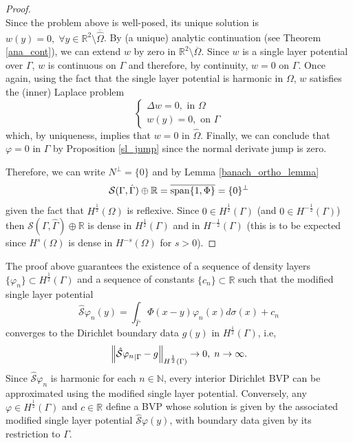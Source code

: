 \begin{proof}
\[    \]
    Since the problem above is well-posed, its unique solution is \(w(y) = 0, \; \forall y \in \mathbb{R}^2\setminus\overline{\hat{\Omega}}\). By (a unique) analytic continuation (see Theorem \eqref{ana_cont}), we can extend \(w\) by zero in \(\mathbb{R}^2\setminus\overline{\Omega}\). Since \(w\) is a single layer potential over \(\Gamma\), \(w\) is continuous on \(\Gamma\) and therefore, by continuity, \(w = 0\) on \(\Gamma\). Once again, using the fact that the single layer potential is harmonic in \(\Omega\), \(w\) satisfies the (inner) Laplace problem
    \[
        \begin{cases}
            \Delta w = 0, \text{ in } \Omega\\
            w(y) = 0, \text{ on } \Gamma
        \end{cases}
    \]
    which, by uniqueness, implies that \(w = 0\) in \(\hat{\Omega}\). Finally, we can conclude that \(\varphi = 0\) in \(\Gamma\) by Proposition \eqref{sl_jump} since the normal derivate jump is zero.

    Therefore, we can write \(N^\perp = \{0\}\) and by Lemma \eqref{banach_ortho_lemma}
    \[
        \mathcal{S}(\Gamma, \hat{\Gamma}) \oplus \mathbb{R} = \overline{\operatorname{span}\{1, \Phi\}} = \{0\}^\perp
    \]
    given the fact that \(H^\frac{1}{2}(\Omega)\) is reflexive. Since \(0 \in H^\frac{1}{2}(\Gamma)\) (and \(0 \in H^{-\frac{1}{2}}(\Gamma)\)) then \(\mathcal{S}(\Gamma, \hat{\Gamma}) \oplus \mathbb{R}\) is dense in \(H^\frac{1}{2}(\Gamma)\) and in \(H^{-\frac{1}{2}}(\Gamma)\) (this is to be expected since \(H^{s}(\Omega)\) is dense in \(H^{-s}(\Omega)\) for \(s > 0\)).
\end{proof}
\begin{remark}
    The proof above guarantees the existence of a sequence of density layers \(\{\varphi_n\} \subset H^{\frac{1}{2}}(\Gamma)\) and a sequence of constants \(\{c_n\} \subset \mathbb{R}\) such that the modified single layer potential
    \[
        \hat{\mathcal{S}}\varphi_n(y) = \int_{\hat{\Gamma}} \Phi(x-y)\varphi_n(x) d\sigma(x) + c_n
    \]
    converges to the Dirichlet boundary data \(g(y)\) in \(H^\frac{1}{2}(\Gamma)\), i.e,
    \[
        \norm{{\hat{\mathcal{S}}\varphi_n}_{|\Gamma} - g}_{H^\frac{1}{2}(\Gamma)} \rightarrow 0, \; n \rightarrow \infty.
    \]
    Since \(\hat{\mathcal{S}}\varphi_n\) is harmonic for each \(n \in \mathbb{N}\), every interior Dirichlet BVP can be approximated using the modified single layer potential. Conversely, any \(\varphi \in H^\frac{1}{2}(\Gamma)\) and \(c \in \mathbb{R}\) define a BVP whose solution is given by the associated modified single layer potential \(\hat{\mathcal{S}}\varphi(y)\), with boundary data given by its restriction to \(\Gamma\).
\end{remark}

